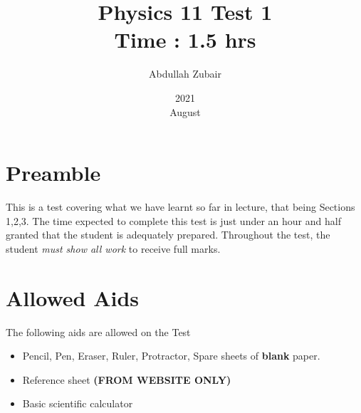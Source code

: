 \documentclass[12pt]{article} %
\title{Physics 11 Test 1 \\ \textbf{Time : 1.5 hrs}}
\date{2021\\ August}
\author{Abdullah Zubair}
\begin{document}
    \renewcommand*{\coursecode}{Test} %
    \renewcommand*{\assgnnumber}{1} %
    \renewcommand*{\submdate}{August 26, 2021} %
    \renewcommand*{\studentfname}{Abdullah} %
    \renewcommand*{\studentlname}{Zubair} %

    \renewcommand\qedsymbol{$\blacksquare$}
    \setfigpath
    \pagestyle{crowdmark}
    \fancyhfoffset[L,O]{0pt} %




	\maketitle
	\section{Preamble}
	This is a test covering what we have learnt so far in lecture, that being Sections 1,2,3. The time expected to complete this test is just under an hour and half granted that the student is adequately prepared. Throughout the test, the student \emph{must show all work} to receive full marks.
	\section{Allowed Aids}
	The following aids are allowed on the Test
	\begin{itemize}
		\item Pencil, Pen, Eraser, Ruler, Protractor, Spare sheets of \textbf{blank} paper.
		\item Reference sheet \textbf{(FROM WEBSITE ONLY)}
		\item Basic scientific calculator
	\end{itemize}
\end{document}

